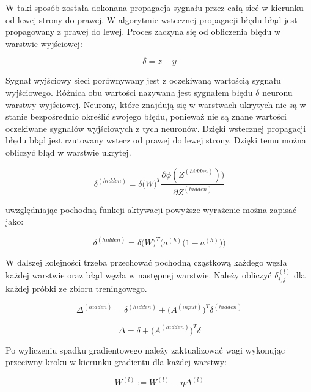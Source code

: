 	W taki sposób została dokonana propagacja sygnału przez całą sieć w kierunku od lewej strony do prawej.	W algorytmie wstecznej propagacji błędu błąd jest propagowany z prawej do lewej. Proces zaczyna się od obliczenia błędu w warstwie wyjściowej:
	
	\begin{equation}
	\delta = z - y 
	\end{equation}
	
	Sygnał wyjściowy sieci porównywany jest z oczekiwaną wartością sygnału wyjściowego. Różnica obu wartości nazywana jest sygnałem błędu $\delta$ neuronu warstwy wyjściowej. Neurony, które znajdują się w warstwach ukrytych nie są w stanie bezpośrednio określić swojego błędu, ponieważ nie są znane wartości oczekiwane sygnałów wyjściowych z tych neuronów. Dzięki wstecznej propagacji błędu błąd jest rzutowany wstecz od prawej do lewej strony. Dzięki temu można obliczyć błąd w warstwie ukrytej.
	
	\begin{equation}
	\delta^{(hidden)} = \delta \big( W \big) ^{T} \frac{\partial \phi(Z^{(hidden)}))}{\partial Z ^{(hidden)}}
	\end{equation}
	
	uwzględniając pochodną funkcji aktywacji powyższe wyrażenie można zapisać jako:
	
	\begin{equation}
		\delta^{(hidden)} = \delta \big(W \big)^{T} \big(a^{(h)} \big(1-a^{(h)}\big)\big)
	\end{equation}
	
	W dalszej kolejności trzeba przechować pochodną cząstkową każdego węzła każdej warstwie oraz błąd węzła w następnej warstwie. Należy obliczyć $\delta_{i,j}^{(l)}$ dla każdej próbki ze zbioru treningowego.
	
	\begin{equation}
		\Delta ^{(hidden)} = \delta^{(hidden)} + \big(A^{(input)}\big)^{T} \delta^{(hidden)}
	\end{equation}
	
	\begin{equation}
	\Delta  = \delta + \big(A^{(hidden)}\big)^{T} \delta
	\end{equation}

	Po wyliczeniu spadku gradientowego należy zaktualizować wagi wykonując przeciwny kroku w kierunku gradientu dla każdej warstwy:
	
	\begin{equation}
		W^{(l)} := W^{(l)} - \eta \Delta^{(l)}
	\end{equation}

